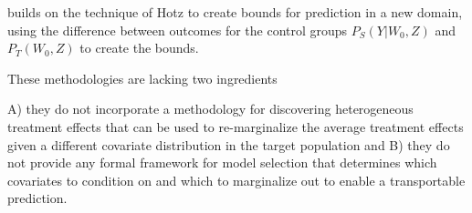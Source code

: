 \documentclass[a4paper,12pt]{article}
\begin{document}
\cite{Gechter2015} builds on the technique of Hotz to create bounds for prediction in a new domain, using the difference between outcomes for the control groups $P_S(Y|W_0, Z)$ and  $P_T(W_0, Z)$ to create the bounds. 

These methodologies are lacking two ingredients 

A) they do not incorporate a methodology for discovering heterogeneous treatment effects that can be used to re-marginalize the average treatment effects given a different covariate distribution in the target population and B) they do not provide any formal framework for model selection that determines which covariates to condition on and which to marginalize out to enable a transportable prediction.














\end{document}
